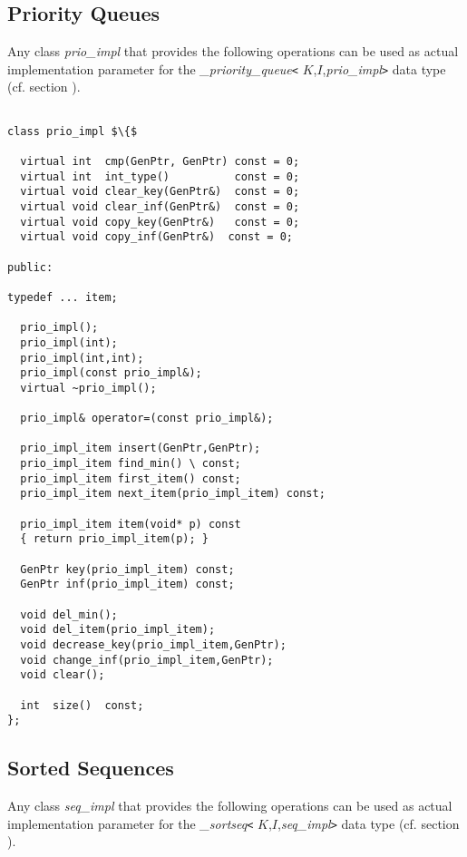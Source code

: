 \subsection{Priority Queues}
\label{User Implementations Priority Queues}

Any class {\it prio\_impl} that provides the following operations can be used as 
actual implementation parameter for the 
{\it \_priority\_queue}{\tt <} $K$,$I$,{\it prio\_impl}{\tt >}
data type (cf. section ).

\begin{verbatim}

class prio_impl $\{$ 

  virtual int  cmp(GenPtr, GenPtr) const = 0;
  virtual int  int_type()          const = 0;
  virtual void clear_key(GenPtr&)  const = 0;
  virtual void clear_inf(GenPtr&)  const = 0;
  virtual void copy_key(GenPtr&)   const = 0;
  virtual void copy_inf(GenPtr&)  const = 0;

public:

typedef ... item;

  prio_impl();
  prio_impl(int);
  prio_impl(int,int);
  prio_impl(const prio_impl&);
  virtual ~prio_impl();

  prio_impl& operator=(const prio_impl&);

  prio_impl_item insert(GenPtr,GenPtr);
  prio_impl_item find_min() \ const;
  prio_impl_item first_item() const;
  prio_impl_item next_item(prio_impl_item) const;

  prio_impl_item item(void* p) const 
  { return prio_impl_item(p); }
 
  GenPtr key(prio_impl_item) const;
  GenPtr inf(prio_impl_item) const;

  void del_min();
  void del_item(prio_impl_item);
  void decrease_key(prio_impl_item,GenPtr);
  void change_inf(prio_impl_item,GenPtr);
  void clear();
  
  int  size()  const;
};
\end{verbatim}

\newpage

\subsection{Sorted Sequences}

\label{User Implementations Sorted Sequences}

Any class {\it seq\_impl} that provides the following operations can be used as 
actual implementation parameter for the 
{\it \_sortseq}{\tt <} $K$,$I$,{\it seq\_impl}{\tt >} data
type (cf. section ).


